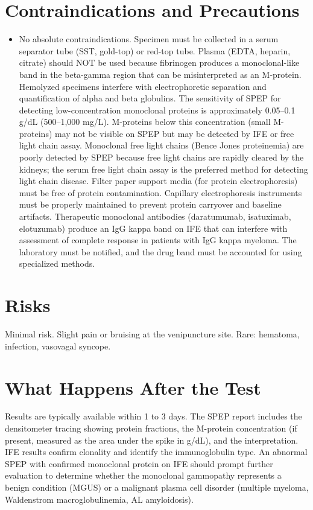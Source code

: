 \section*{Contraindications and Precautions}
\begin{itemize}
  \item No absolute contraindications. Specimen must be collected in a serum separator tube (SST, gold-top) or red-top tube. Plasma (EDTA, heparin, citrate) should NOT be used because fibrinogen produces a monoclonal-like band in the beta-gamma region that can be misinterpreted as an M-protein. Hemolyzed specimens interfere with electrophoretic separation and quantification of alpha and beta globulins. The sensitivity of SPEP for detecting low-concentration monoclonal proteins is approximately 0.05--0.1 g/dL (500--1,000 mg/L). M-proteins below this concentration (small M-proteins) may not be visible on SPEP but may be detected by IFE or free light chain assay. Monoclonal free light chains (Bence Jones proteinemia) are poorly detected by SPEP because free light chains are rapidly cleared by the kidneys; the serum free light chain assay is the preferred method for detecting light chain disease. Filter paper support media (for protein electrophoresis) must be free of protein contamination. Capillary electrophoresis instruments must be properly maintained to prevent protein carryover and baseline artifacts. Therapeutic monoclonal antibodies (daratumumab, isatuximab, elotuzumab) produce an IgG kappa band on IFE that can interfere with assessment of complete response in patients with IgG kappa myeloma. The laboratory must be notified, and the drug band must be accounted for using specialized methods.
\end{itemize}
\section*{Risks}
Minimal risk. Slight pain or bruising at the venipuncture site. Rare: hematoma, infection, vasovagal syncope.

\section*{What Happens After the Test}
Results are typically available within 1 to 3 days. The SPEP report includes the densitometer tracing showing protein fractions, the M-protein concentration (if present, measured as the area under the spike in g/dL), and the interpretation. IFE results confirm clonality and identify the immunoglobulin type. An abnormal SPEP with confirmed monoclonal protein on IFE should prompt further evaluation to determine whether the monoclonal gammopathy represents a benign condition (MGUS) or a malignant plasma cell disorder (multiple myeloma, Waldenstrom macroglobulinemia, AL amyloidosis).

